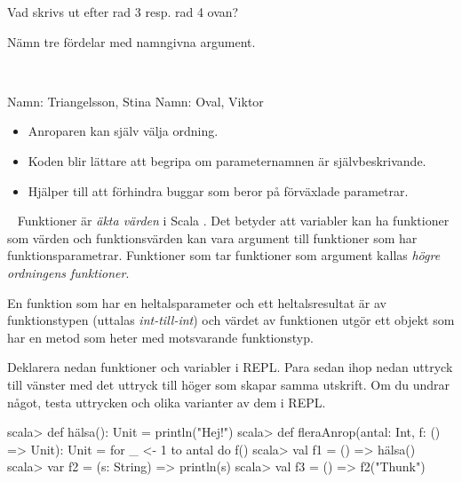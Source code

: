 \Subtask Vad skrivs ut efter rad 3 resp. rad 4 ovan?

\Subtask Nämn tre fördelar med namngivna argument.

\SOLUTION

\TaskSolved \what~

\SubtaskSolved
\begin{REPL}
Namn: Triangelsson, Stina
Namn: Oval, Viktor
\end{REPL}

\SubtaskSolved
\begin{itemize}
  \item Anroparen kan själv välja ordning.
  \item Koden blir lättare att begripa om parameternamnen är självbeskrivande.
  \item Hjälper till att förhindra buggar som beror på förväxlade parametrar.
\end{itemize}

\QUESTEND




\QUESTBEGIN

\Task  \what~  Funktioner är \emph{äkta värden} i Scala%
. Det betyder att variabler kan ha funktioner som värden och funktionsvärden kan vara argument till funktioner som har funktionsparametrar. Funktioner som tar funktioner som argument kallas \emph{högre ordningens funktioner}.

En funktion som har en heltalsparameter och ett heltalsresultat är av funktionstypen  (uttalas \emph{int-till-int}) och värdet av funktionen utgör ett objekt som har en metod som heter  med motsvarande funktionstyp.

\Subtask \label{subtask:funcval} Deklarera nedan funktioner och variabler i REPL. Para sedan ihop nedan uttryck till vänster med det uttryck till höger som skapar samma utskrift. Om du undrar något, testa uttrycken och olika varianter av dem i REPL.

\begin{REPL}
scala> def hälsa(): Unit = println("Hej!")
scala> def fleraAnrop(antal: Int, f: () => Unit): Unit =
         for _ <- 1 to antal do f()
scala> val f1 = () => hälsa()
scala> var f2 = (s: String) => println(s)
scala> val f3 = () => f2("Thunk")
\end{REPL}

\begin{ConceptConnections}

\end{ConceptConnections}


